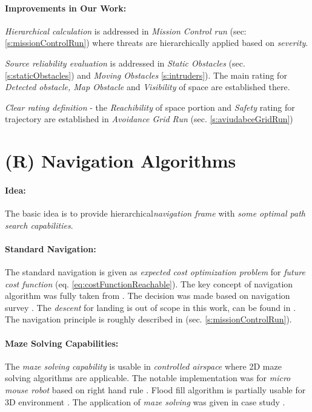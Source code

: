 \paragraph{Improvements in Our Work:}

\emph{Hierarchical calculation} is addressed in \emph{Mission Control run} (sec: \ref{s:missionControlRun}) where threats are hierarchically applied based on \emph{severity}.

\emph{Source reliability evaluation} is addressed in \emph{Static Obstacles} (sec. \ref{s:staticObstacles}) and \emph{Moving Obstacles} \ref{s:intruders}). The main rating for \emph{Detected obstacle, Map Obstacle} and \emph{Visibility} of space are established there. 

\emph{Clear rating definition} - the \emph{Reachibility} of space portion and \emph{Safety} rating for trajectory are established in \emph{Avoidance Grid Run} (sec. \ref{s:aviudabceGridRun})



\section{(R) Navigation Algorithms}\label{s:NavigationAlgorithms}
\paragraph{Idea:} The basic idea is to provide hierarchical\emph{navigation frame} with \emph{some optimal path search capabilities}. 

\paragraph{Standard Navigation:} The standard navigation is given as \emph{expected cost optimization problem} for \emph{future cost function} (eq. \ref{eq:costFunctionReachable}). The key concept of navigation algorithm was fully taken from \cite{gardi2018multi}. The decision was made based on navigation survey \cite{goerzen2010survey}. The \emph{descent} for landing is out of scope in this work, can be found in \cite{lim2018energy}. The navigation principle is roughly described in (sec. \ref{s:missionControlRun}).


\paragraph{Maze Solving Capabilities:} The \emph{maze solving capability} is usable in \emph{controlled airspace} where 2D maze solving algorithms are applicable. The notable implementation was for \emph{micro mouse robot} based on right hand rule \cite{mishra2008maze}. Flood fill algorithm is partially usable for 3D environment \cite{elshamarka2012design}. The application of \emph{maze solving} was given in case study \cite{chatelais2014maze}.

